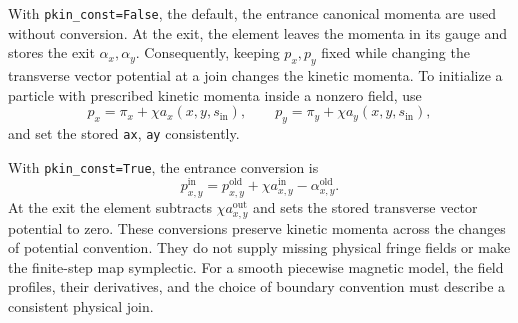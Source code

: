 With \texttt{pkin\_const=False}, the default, the entrance canonical
momenta are used without conversion. At the exit, the element leaves the
momenta in its gauge and stores the exit \(\alpha_x,\alpha_y\).
Consequently, keeping \(p_x,p_y\) fixed while changing the transverse
vector potential at a join changes the kinetic momenta. To initialize a
particle with prescribed kinetic momenta inside a nonzero field, use
\begin{equation}
 p_x=\pi_x+\chi a_x(x,y,s_{\mathrm{in}}),\qquad
 p_y=\pi_y+\chi a_y(x,y,s_{\mathrm{in}}),
\end{equation}
and set the stored \texttt{ax}, \texttt{ay} consistently.

With \texttt{pkin\_const=True}, the entrance conversion is
\begin{equation}
 p_{x,y}^{\mathrm{in}}=p_{x,y}^{\mathrm{old}}
          +\chi a_{x,y}^{\mathrm{in}}-\alpha_{x,y}^{\mathrm{old}}.
\end{equation}
At the exit the element subtracts \(\chi a_{x,y}^{\mathrm{out}}\) and
sets the stored transverse vector potential to zero. These conversions
preserve kinetic momenta across the changes of potential convention.
They do not supply missing physical fringe fields or make the finite-step
map symplectic. For a smooth piecewise magnetic model, the field profiles,
their derivatives, and the choice of boundary convention must describe a
consistent physical join.
